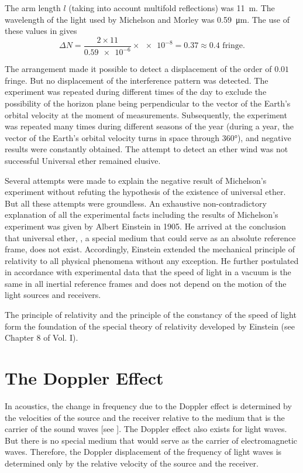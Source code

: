 The arm length $l$ (taking into account multifold reflections) was \SI{11}{m}.
The wavelength of the light used by Michelson and Morley was \SI{0.59}{\micro\metre}.
The use of these values in  gives
\begin{equation*}
	\Delta{N} = \frac{2\times 11}{\num{0.59e-6}} \times \num{e-8} = 0.37 \approx 0.4\text{ fringe}.
\end{equation*}

\noindent
The arrangement made it possible to detect a displacement of the order of $0.01$ fringe.
But no displacement of the interference pattern was detected.
The experiment was repeated during different times of the day to exclude the possibility of the horizon plane being perpendicular to the vector of the Earth's orbital velocity at the moment of measurements.
Subsequently, the experiment was repeated many times during different seasons of the year (during a year, the vector of the Earth's orbital velocity turns in space through \ang{360}), and negative results were constantly obtained.
The attempt to detect an ether wind was not successful Universal ether remained elusive.

Several attempts were made to explain the negative result of Michelson's experiment without refuting the hypothesis of the existence
of universal ether.
But all these attempts were groundless.
An exhaustive non-contradictory explanation of all the experimental facts including the results of Michelson's experiment was given by Albert Einstein in 1905.
He arrived at the conclusion that universal ether, \ie, a special medium that could serve as an absolute reference frame, does not exist.
Accordingly, Einstein extended the mechanical principle of relativity to all physical phenomena without any exception.
He further postulated in accordance with experimental data that the speed of light in a vacuum is the same in all inertial reference frames and does not depend on the motion of the light sources and receivers.

The principle of relativity and the principle of the constancy of the speed of light form the foundation of the special theory of relativity developed by Einstein (see Chapter 8 of Vol. I).

\section{The Doppler Effect}\label{sec:21_4}

In acoustics, the change in frequency due to the Doppler effect is determined by the velocities of the source and the receiver relative to the medium that is the carrier of the sound waves [see ].
The Doppler effect also exists for light waves.
But there is no special medium that would serve as the carrier of electromagnetic waves.
Therefore, the Doppler displacement of the frequency of light waves is determined only by the relative velocity of the source and the receiver.

